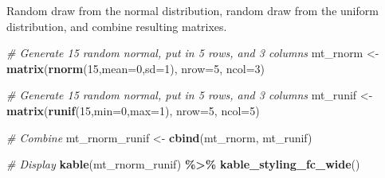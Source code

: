 \documentclass[
]{book}
\newenvironment{Shaded}{\begin{snugshade}}{\end{snugshade}}
\newcommand{\CommentTok}[1]{\textcolor[rgb]{0.56,0.35,0.01}{\textit{#1}}}
\newcommand{\DataTypeTok}[1]{\textcolor[rgb]{0.13,0.29,0.53}{#1}}
\newcommand{\DecValTok}[1]{\textcolor[rgb]{0.00,0.00,0.81}{#1}}
\newcommand{\KeywordTok}[1]{\textcolor[rgb]{0.13,0.29,0.53}{\textbf{#1}}}
\newcommand{\NormalTok}[1]{#1}
\newcommand{\OperatorTok}[1]{\textcolor[rgb]{0.81,0.36,0.00}{\textbf{#1}}}
\newcommand{\StringTok}[1]{\textcolor[rgb]{0.31,0.60,0.02}{#1}}
\begin{document}
Random draw from the normal distribution, random draw from the uniform distribution, and combine resulting matrixes.

\begin{Shaded}
\begin{Highlighting}[]
\CommentTok{\# Generate 15 random normal, put in 5 rows, and 3 columns}
\NormalTok{mt\_rnorm \textless{}{-}}\StringTok{ }\KeywordTok{matrix}\NormalTok{(}\KeywordTok{rnorm}\NormalTok{(}\DecValTok{15}\NormalTok{,}\DataTypeTok{mean=}\DecValTok{0}\NormalTok{,}\DataTypeTok{sd=}\DecValTok{1}\NormalTok{), }\DataTypeTok{nrow=}\DecValTok{5}\NormalTok{, }\DataTypeTok{ncol=}\DecValTok{3}\NormalTok{)}

\CommentTok{\# Generate 15 random normal, put in 5 rows, and 3 columns}
\NormalTok{mt\_runif \textless{}{-}}\StringTok{ }\KeywordTok{matrix}\NormalTok{(}\KeywordTok{runif}\NormalTok{(}\DecValTok{15}\NormalTok{,}\DataTypeTok{min=}\DecValTok{0}\NormalTok{,}\DataTypeTok{max=}\DecValTok{1}\NormalTok{), }\DataTypeTok{nrow=}\DecValTok{5}\NormalTok{, }\DataTypeTok{ncol=}\DecValTok{5}\NormalTok{)}

\CommentTok{\# Combine}
\NormalTok{mt\_rnorm\_runif \textless{}{-}}\StringTok{ }\KeywordTok{cbind}\NormalTok{(mt\_rnorm, mt\_runif)}

\CommentTok{\# Display}
\KeywordTok{kable}\NormalTok{(mt\_rnorm\_runif) }\OperatorTok{\%\textgreater{}\%}
\StringTok{  }\KeywordTok{kable\_styling\_fc\_wide}\NormalTok{()}
\end{Highlighting}
\end{Shaded}

\begin{table}[!h]
\centering
{}
\end{table}
\end{document}
